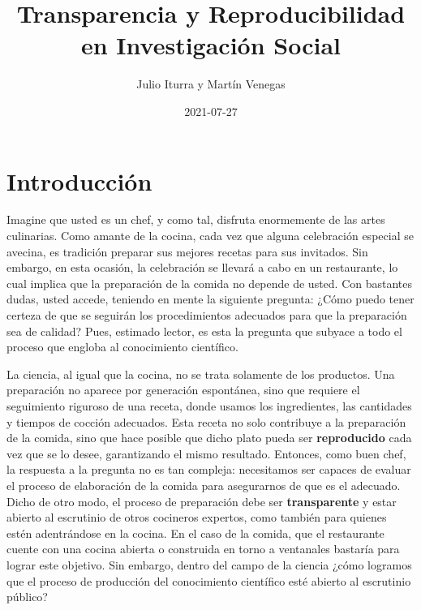 \documentclass[
]{book}
\title{Transparencia y Reproducibilidad en Investigación Social}
\author{Julio Iturra y Martín Venegas}
\date{2021-07-27}
\begin{document}
\maketitle

{
\setcounter{tocdepth}{1}
\tableofcontents
}
\hypertarget{intro}{%
\chapter{Introducción}\label{intro}}

Imagine que usted es un chef, y como tal, disfruta enormemente de las artes culinarias. Como amante de la cocina, cada vez que alguna celebración especial se avecina, es tradición preparar sus mejores recetas para sus invitados. Sin embargo, en esta ocasión, la celebración se llevará a cabo en un restaurante, lo cual implica que la preparación de la comida no depende de usted. Con bastantes dudas, usted accede, teniendo en mente la siguiente pregunta: ¿Cómo puedo tener certeza de que se seguirán los procedimientos adecuados para que la preparación sea de calidad? Pues, estimado lector, es esta la pregunta que subyace a todo el proceso que engloba al conocimiento científico.

La ciencia, al igual que la cocina, no se trata solamente de los productos. Una preparación no aparece por generación espontánea, sino que requiere el seguimiento riguroso de una receta, donde usamos los ingredientes, las cantidades y tiempos de cocción adecuados. Esta receta no solo contribuye a la preparación de la comida, sino que hace posible que dicho plato pueda ser \textbf{reproducido} cada vez que se lo desee, garantizando el mismo resultado. Entonces, como buen chef, la respuesta a la pregunta no es tan compleja: necesitamos ser capaces de evaluar el proceso de elaboración de la comida para asegurarnos de que es el adecuado. Dicho de otro modo, el proceso de preparación debe ser \textbf{transparente} y estar abierto al escrutinio de otros cocineros expertos, como también para quienes estén adentrándose en la cocina. En el caso de la comida, que el restaurante cuente con una cocina abierta o construida en torno a ventanales bastaría para lograr este objetivo. Sin embargo, dentro del campo de la ciencia ¿cómo logramos que el proceso de producción del conocimiento científico esté abierto al escrutinio público?
\end{document}
